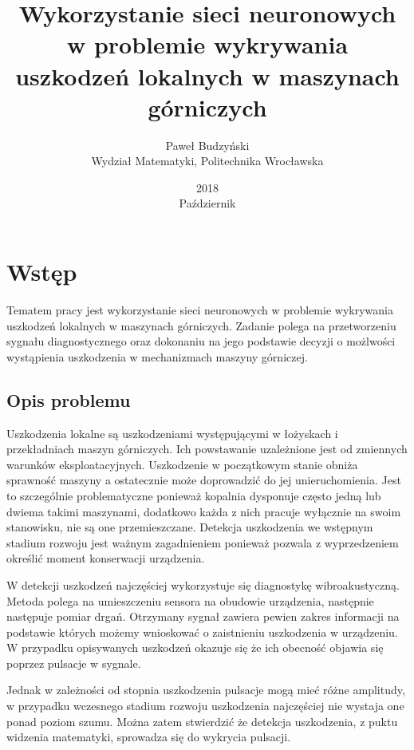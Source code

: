 \documentclass[12pt, a4paper, oneside]{article}
\author{Paweł Budzyński \\ Wydział Matematyki, Politechnika Wrocławska}
\title{\textbf{Wykorzystanie sieci neuronowych w problemie wykrywania uszkodzeń lokalnych w maszynach górniczych}}
\date{2018 \\ Październik}
\newcommand{\mychapter}[2]{
	\setcounter{chapter}{#1}
	\setcounter{section}{0}
	\chapter*{#2}
	\addcontentsline{toc}{chapter}{#2}
}
\begin{document}
	\maketitle
	\section{Wstęp}
	Tematem pracy jest wykorzystanie sieci neuronowych w problemie wykrywania uszkodzeń lokalnych w maszynach górniczych. Zadanie polega na przetworzeniu sygnału diagnostycznego oraz dokonaniu na jego podstawie decyzji o możlwości wystąpienia uszkodzenia w mechanizmach maszyny górniczej.
	
	\subsection{Opis problemu}
	
	Uszkodzenia lokalne są uszkodzeniami występującymi w łożyskach i przekładniach maszyn górniczych. Ich powstawanie uzależnione jest od zmiennych warunków eksploatacyjnych. Uszkodzenie w początkowym stanie obniża sprawność maszyny a ostatecznie może doprowadzić do jej unieruchomienia. Jest to szczególnie problematyczne ponieważ kopalnia dysponuje często jedną lub dwiema takimi maszynami, dodatkowo każda z nich pracuje wyłącznie na swoim stanowisku, nie są one przemieszczane. Detekcja uszkodzenia we wstępnym stadium rozwoju jest ważnym zagadnieniem ponieważ pozwala z wyprzedzeniem określić moment konserwacji urządzenia. 
	
	W detekcji uszkodzeń najczęściej wykorzystuje się diagnostykę wibroakustyczną. Metoda polega na umieszczeniu sensora na obudowie urządzenia, następnie następuje pomiar drgań. Otrzymany sygnał zawiera pewien zakres informacji na podstawie których możemy wnioskować o zaistnieniu uszkodzenia w urządzeniu. W przypadku opisywanych uszkodzeń okazuje się że ich obecność objawia się poprzez pulsacje w sygnale.
	
	Jednak w zależności od stopnia uszkodzenia pulsacje mogą mieć różne amplitudy, w przypadku wczesnego stadium rozwoju uszkodzenia najczęściej nie wystaja one ponad poziom szumu.
	Można zatem stwierdzić że detekcja uszkodzenia, z puktu widzenia matematyki, sprowadza się do wykrycia pulsacji. 
	
	
\end{document}
